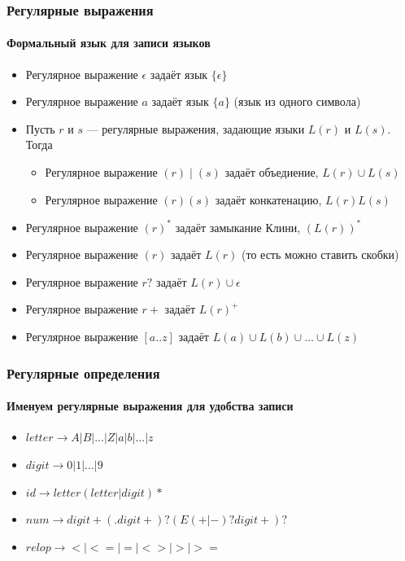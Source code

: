 \documentclass[xetex,mathserif,serif]{beamer}
\begin{document}
    \begin{frame}
        \frametitle{Регулярные выражения}
        \framesubtitle{Формальный язык для записи языков}
        \begin{itemize}
            \item Регулярное выражение $\epsilon$ задаёт язык $\{\epsilon\}$
            \item Регулярное выражение $a$ задаёт язык $\{a\}$ (язык из одного символа)
            \item Пусть $r$ и $s$ --- регулярные выражения, задающие языки $L(r)$ и $L(s)$. Тогда
            \begin{itemize}
                \item Регулярное выражение $(r) \mid (s)$ задаёт объедиение, $L(r) \cup L(s)$
                \item Регулярное выражение $(r)(s)$ задаёт конкатенацию, $L(r)L(s)$
            \end{itemize}
            \item Регулярное выражение $(r)^*$ задаёт замыкание Клини, $(L(r))^*$
            \item Регулярное выражение $(r)$ задаёт $L(r)$ (то есть можно ставить скобки)
            \item Регулярное выражение $r?$ задаёт $L(r) \cup \epsilon$
            \item Регулярное выражение $r+$ задаёт $L(r)^+$
            \item Регулярное выражение $[a..z]$ задаёт $L(a) \cup L(b) \cup \ldots \cup L(z)$
        \end{itemize}
    \end{frame}

    \begin{frame}
        \frametitle{Регулярные определения}
        \framesubtitle{Именуем регулярные выражения для удобства записи}
        \begin{itemize}
            \item $letter \rightarrow A | B | ... | Z | a | b | ... | z$
            \item $digit \rightarrow 0 | 1 | ... | 9$
            \item $id \rightarrow letter (letter | digit)*$
            \item $num \rightarrow digit+ (. digit+)? (E(+ | -)? digit+)?$
            \item $relop \rightarrow < | <= | = | <> | > | >=$
        \end{itemize}
    \end{frame}
\end{document}
